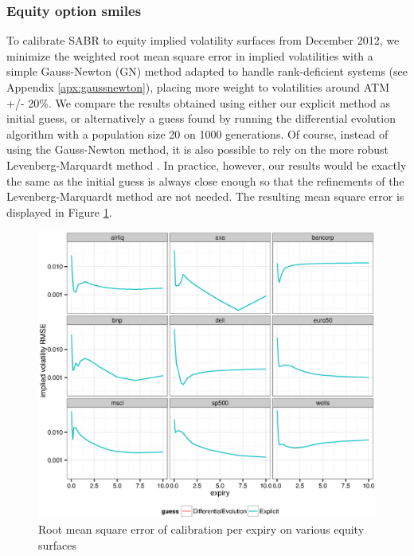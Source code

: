 \documentclass[]{rAMF2e}
\begin{document}
\subsubsection{Equity option smiles}
To calibrate SABR to equity implied volatility surfaces from December 2012, we minimize the weighted root mean square error in implied volatilities with a simple Gauss-Newton (GN) method adapted to handle rank-deficient systems (see Appendix \ref{apx:gaussnewton}), placing more weight to volatilities around ATM +/- 20\%. We compare the results obtained using either our explicit method as initial guess, or alternatively a guess found by running the differential evolution algorithm \citep{storn1997differential} with a population size 20 on 1000 generations. Of course, instead of using the Gauss-Newton method, it is also possible to rely on the more robust Levenberg-Marquardt method \citep{levenberg1944method,marquardt1963algorithm}. In practice, however, our results would be exactly the same as the initial guess is always close enough so that the refinements of the Levenberg-Marquardt method are not needed. The resulting mean square error is displayed in Figure \ref{fig:explicit_de_equity_error}.

\begin{figure}[!h]
  \caption{\label{fig:explicit_de_equity_error}Root mean square error of calibration per expiry on various equity surfaces}
\begin{center}
 \includegraphics[width=16cm]{explicit_de_equity_error.eps}
\end{center}
\end{figure}
\end{document}
